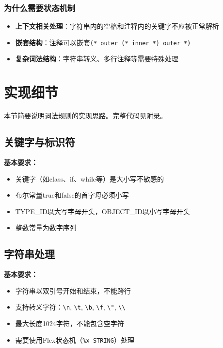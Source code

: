 \documentclass[twocolumn]{article}
\begin{document}
\subsubsection{为什么需要状态机制}
\begin{itemize}
    \item \textbf{上下文相关处理}：字符串内的空格和注释内的关键字不应被正常解析
    \item \textbf{嵌套结构}：注释可以嵌套\texttt{(* outer (* inner *) outer *)}
    \item \textbf{复杂词法结构}：字符串转义、多行注释等需要特殊处理
\end{itemize}

\section{实现细节}
本节简要说明词法规则的实现思路。完整代码见附录。

\subsection{关键字与标识符}

\textbf{基本要求：}
\begin{itemize}
    \item 关键字（如class、if、while等）是大小写不敏感的
    \item 布尔常量true和false的首字母必须小写
    \item TYPE\_ID以大写字母开头，OBJECT\_ID以小写字母开头
    \item 整数常量为数字序列
\end{itemize}

\textcolor{red}{%
}

\subsection{字符串处理}

\textbf{基本要求：}
\begin{itemize}
    \item 字符串以双引号开始和结束，不能跨行
    \item 支持转义字符：\texttt{\textbackslash n}, \texttt{\textbackslash t}, \texttt{\textbackslash b}, \texttt{\textbackslash f}, \texttt{\textbackslash"}, \texttt{\textbackslash\textbackslash}
    \item 最大长度1024字符，不能包含空字符
    \item 需要使用Flex状态机（\texttt{\%x STRING}）处理
\end{itemize}
\end{document}
